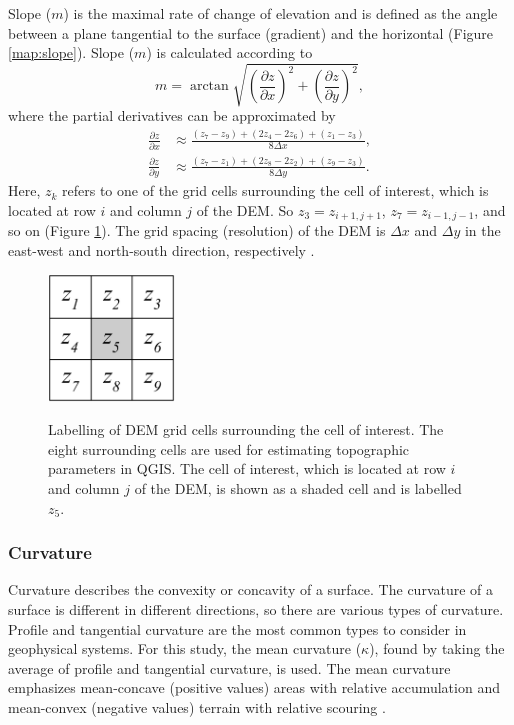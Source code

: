 \documentclass{sfuthesis}
\begin{document}
Slope ($m$) is the maximal rate of change of elevation and is defined as the angle between a plane tangential to the surface (gradient) and the horizontal \citep{Olaya2009} (Figure \ref{map:slope}). Slope ($m$) is calculated according to 
\begin{equation}
m = \arctan \sqrt{\left( \frac{\partial z}{\partial x} \right) ^2 + \left( \frac{\partial z}{\partial y} \right) ^2},
\end{equation}
where the partial derivatives can be approximated by \citep{Mitavsova1993, Neteler2008, Hofierka2009}
\begin{align} \label{eq:firstpartial}
\frac{\partial z}{\partial x} &\approx \frac{(z_7-z_9)+(2z_4-2z_6)+(z_1-z_3)}{8  \Delta x},\nonumber \\
\frac{\partial z}{\partial y} &\approx \frac{(z_7-z_1)+(2z_8-2z_2)+(z_9-z_3)}{8  \Delta y}.
\end{align}
Here, $z_k$ refers to one of the grid cells surrounding the cell of interest, which is located at row $i$ and column $j$ of the DEM. So $z_3 = z_{i+1,j+1}$, $z_7 = z_{i-1,j-1}$, and so on (Figure \ref{fig:DEMgrid}). The grid spacing (resolution) of the DEM is $\Delta x$ and $\Delta y$ in the east-west and north-south direction, respectively \citep{Neteler2008}. 

\begin{figure}[h]
	\centering
	\includegraphics[width = 0.3\textwidth]{DEMGrid.png}\\
	\caption{Labelling of DEM grid cells surrounding the cell of interest. The eight surrounding cells are used for estimating topographic parameters in QGIS. The cell of interest, which is located at row $i$ and column $j$ of the DEM, is shown as a shaded cell and is labelled $z_5$.}
	\label{fig:DEMgrid}
\end{figure}

\subsubsection*{Curvature} 

Curvature describes the convexity or concavity of a surface. The curvature of a surface is different in different directions, so there are various types of curvature. Profile and tangential curvature are the most common types to consider in geophysical systems. For this study, the mean curvature ($\kappa$), found by taking the average of profile and tangential curvature, is used. The mean curvature emphasizes mean-concave (positive values) areas with relative accumulation and mean-convex (negative values) terrain with relative scouring \citep{Olaya2009}.
\end{document}
